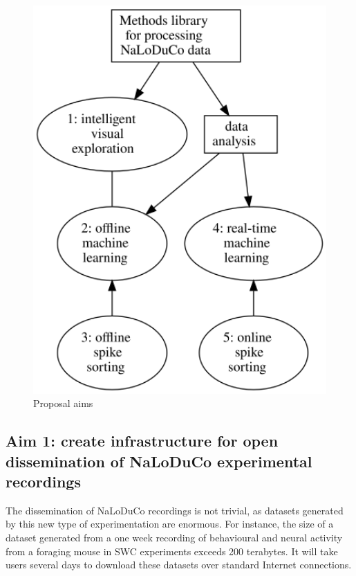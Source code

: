 \documentclass[12pt]{article}
\begin{document}
\begin{figure}
    \begin{center}
        \includegraphics[width=5in]{figures/aims.png}
    \end{center}
    \caption{Proposal aims}
    \label{fig:aims}
\end{figure}

\subsection*{Aim 1: create infrastructure for open dissemination of NaLoDuCo
experimental recordings}

The dissemination of NaLoDuCo recordings is not
trivial, as datasets generated by this new type of experimentation are
enormous. For instance, the size of a dataset generated from a one week
recording of behavioural and neural activity from a foraging mouse in SWC
experiments exceeds 200 terabytes. It will take users several days to download
these datasets over standard Internet connections.
\end{document}
